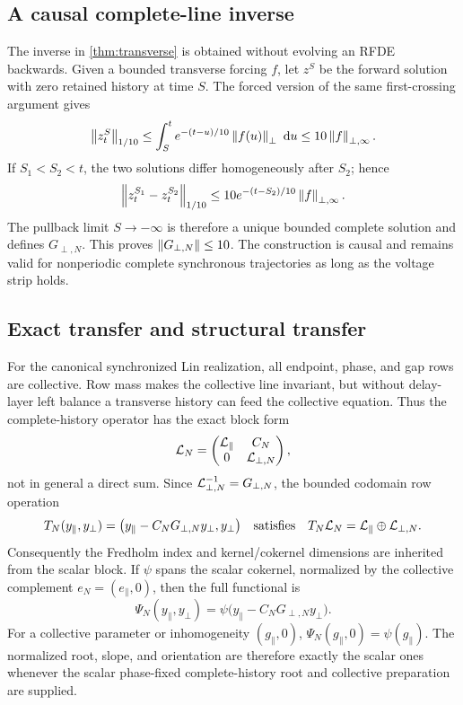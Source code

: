 \subsection{A causal complete-line inverse}

The inverse in \cref{thm:transverse} is obtained without evolving an RFDE
backwards.  Given a bounded transverse forcing \(f\), let \(z^S\) be the
forward solution with zero retained history at time \(S\).  The forced
version of the same first-crossing argument gives
\begin{equation}
 \left\lVert z_t^S\right\rVert_{1/10}
 \le\int_S^t e^{-(t-u)/10}\left\lVert f(u)\right\rVert_\perp\,\,\mathrm d u
 \le10\left\lVert f\right\rVert_{\perp,\infty}.                         \label{eq:forced-pullback}
\end{equation}
If \(S_1<S_2<t\), the two solutions differ homogeneously after \(S_2\);
hence
\[
 \left\lVert z_t^{S_1}-z_t^{S_2}\right\rVert_{1/10}
 \le10e^{-(t-S_2)/10}\left\lVert f\right\rVert_{\perp,\infty}.
\]
The pullback limit \(S\to-\infty\) is therefore a unique bounded complete
solution and defines \(G_{\perp,N}\).  This proves
\(\left\lVert G_{\perp,N}\right\rVert\le10\).  The construction is causal and remains valid
for nonperiodic complete synchronous trajectories as long as the voltage
strip holds.

\subsection{Exact transfer and structural transfer}

For the canonical synchronized Lin realization, all endpoint, phase, and
gap rows are collective.  Row mass makes the collective line invariant, but
without delay-layer left balance a transverse history can feed the
collective equation.  Thus the complete-history operator has the exact block
form
\[
 \mathcal L_N=
 \begin{pmatrix}\mathcal L_\parallel&C_N\\0&\mathcal L_{\perp,N}\end{pmatrix},
\]
not in general a direct sum.  Since
\(\mathcal L_{\perp,N}^{-1}=G_{\perp,N}\), the bounded codomain row operation
\begin{equation}
 T_N(y_\parallel,y_\perp)
 =\bigl(y_\parallel-C_NG_{\perp,N}y_\perp,y_\perp\bigr)
 \quad\hbox{satisfies}\quad
 T_N\mathcal L_N=\mathcal L_\parallel\oplus\mathcal L_{\perp,N}.            \label{eq:triangular-row-reduction}
\end{equation}
Consequently the Fredholm index and kernel/cokernel dimensions are inherited
from the scalar block.  If \(\psi\) spans the scalar cokernel, normalized by
the collective complement \(e_N=(e_\parallel,0)\), then the full functional
is
\begin{equation}
 \Psi_N(y_\parallel,y_\perp)
 =\psi\bigl(y_\parallel-C_NG_{\perp,N}y_\perp\bigr).   \label{eq:triangular-cokernel}
\end{equation}
For a collective parameter or inhomogeneity
\((g_\parallel,0)\), \(\Psi_N(g_\parallel,0)=\psi(g_\parallel)\).
The normalized root, slope, and orientation are therefore exactly the scalar
ones whenever the scalar phase-fixed complete-history root and collective
preparation are supplied.

